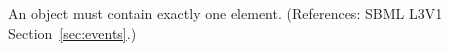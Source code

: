 An \EventAssignment object must contain exactly one  element.
(References: SBML L3V1 Section~\ref{sec:events}.)
